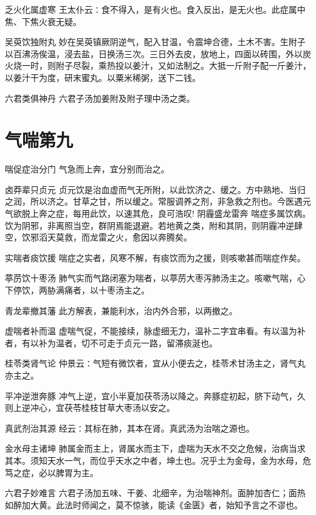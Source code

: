 \documentclass[a4paper,12pt,UTF8,twoside]{ctexbook}
\begin{document}
    乏火化属虚寒
    王太仆云∶食不得入，是有火也。食入反出，是无火也。此症属中焦、下焦火衰无疑。
    
    吴萸饮独附丸
    妙在吴萸镇厥阴逆气，配入甘温，令震坤合德，土木不害。生附子以百沸汤俟温，浸去盐，日换汤三次。三日外去皮，放地上，四面以砖围，外以炭火烧一时，则附子尽裂，乘热投以姜汁，又如法制之。大抵一斤附子配一斤姜汁，以姜汁干为度，研末蜜丸。以粟米稀粥，送下二钱。
    
    六君类俱神丹
    六君子汤加姜附及附子理中汤之类。
    
  \section{气喘第九}
    喘促症治分门
    气急而上奔，宜分别而治之。
    
    卤莽辈只贞元
    贞元饮是治血虚而气无所附，以此饮济之、缓之。方中熟地、当归之润，所以济之。甘草之甘，所以缓之。常服调养之剂，非急救之剂也。今医遇元气欲脱上奔之症，每用此饮，以速其危，良可浩叹!
    阴霾盛龙雷奔
    喘症多属饮病。饮为阴邪，非离照当空，群阴焉能退避。若地黄之类，附和其阴，则阴霾冲逆肆空，饮邪滔天莫救，而龙雷之火，愈因以奔腾矣。
    
    实喘者痰饮援
    喘症之实者，风寒不解，有痰饮而为之援，则咳嗽甚而喘症作矣。
    
    葶苈饮十枣汤
    肺气实而气路闭塞为喘者，以葶苈大枣泻肺汤主之。咳嗽气喘，心下停饮，两胁满痛者，以十枣汤主之。
    
    青龙辈撤其藩
    此方解表，兼能利水，治内外合邪，以两撤之。
    
    虚喘者补而温
    虚喘气促，不能接续，脉虚细无力，温补二字宜串看。有以温为补者，有以补为温者，切不可走于贞元一路，留滞痰涎也。
    
    桂苓类肾气论
    仲景云∶气短有微饮者，宜从小便去之，桂苓术甘汤主之，肾气丸亦主之。
    
    平冲逆泄奔豚
    冲气上逆，宜小半夏加茯苓汤以降之。奔豚症初起，脐下动气，久则上逆冲心，宜茯苓桂枝甘草大枣汤以安之。
    
    真武剂治其源
    经云∶其标在肺，其本在肾。真武汤为治喘之源也。
    
    金水母主诸坤
    肺属金而主上，肾属水而主下，虚喘为天水不交之危候，治病当求其本。须知天水一气，而位乎天水之中者，坤土也。况乎土为金母，金为水母，危笃之症，必以脾胃为主。
    
    六君子妙难言
    六君子汤加五味、干姜、北细辛，为治喘神剂。面肿加杏仁；面热如醉加大黄。此法时师闻之，莫不惊骇，能读《金匮》者，始知予言之不谬也。
    
\end{document}
